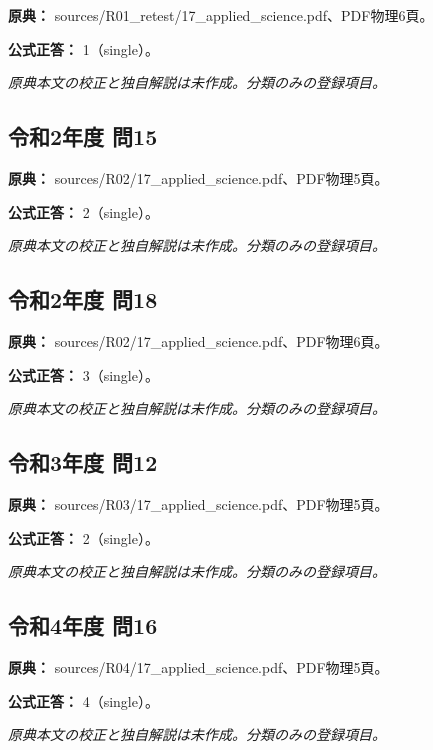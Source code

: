 \noindent\textbf{原典：} sources/R01\_retest/17\_applied\_science.pdf、PDF物理6頁。

\textbf{公式正答：} 1（single）。

\par\textit{原典本文の校正と独自解説は未作成。分類のみの登録項目。}

\subsection{令和2年度 問15}
\label{q:r02-reg-applied-15}

\noindent\textbf{原典：} sources/R02/17\_applied\_science.pdf、PDF物理5頁。

\textbf{公式正答：} 2（single）。

\par\textit{原典本文の校正と独自解説は未作成。分類のみの登録項目。}

\subsection{令和2年度 問18}
\label{q:r02-reg-applied-18}

\noindent\textbf{原典：} sources/R02/17\_applied\_science.pdf、PDF物理6頁。

\textbf{公式正答：} 3（single）。

\par\textit{原典本文の校正と独自解説は未作成。分類のみの登録項目。}

\subsection{令和3年度 問12}
\label{q:r03-reg-applied-12}

\noindent\textbf{原典：} sources/R03/17\_applied\_science.pdf、PDF物理5頁。

\textbf{公式正答：} 2（single）。

\par\textit{原典本文の校正と独自解説は未作成。分類のみの登録項目。}

\subsection{令和4年度 問16}
\label{q:r04-reg-applied-16}

\noindent\textbf{原典：} sources/R04/17\_applied\_science.pdf、PDF物理5頁。

\textbf{公式正答：} 4（single）。

\par\textit{原典本文の校正と独自解説は未作成。分類のみの登録項目。}

